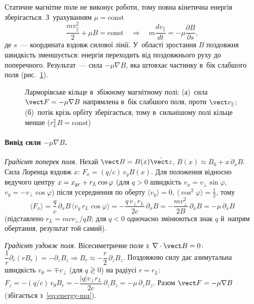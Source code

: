 Статичне магнітне поле не виконує роботи, тому повна кінетична енергія зберігається. З~урахуванням
$\mu=\mathrm{const}$
\begin{equation}\label{eq:energy-mu}
	\frac{mv_\parallel^2}2+\mu B=\mathrm{const}\quad\Rightarrow\quad m\frac{dv_\parallel}{dt}=-\mu\frac{\partial B}{\partial s},
\end{equation}
де $s$~--- координата вздовж силової лінії. У~області зростання $B$ поздовжня швидкість
зменшується: енергія переходить від поздовжнього руху до поперечного. Результат~--- сила
$-\mu\nabla B$, яка штовхає частинку в~бік слабшого поля (рис.~\ref{fig:gradb-force}).

\begin{figure}[ht]\centering
	\begin{subfigure}[t]{0.5\linewidth}\centering
		\caption{}
	\end{subfigure}%
	\begin{subfigure}[t]{0.5\linewidth}\centering
		\caption{}
	\end{subfigure}
	\caption{Ларморівське кільце в~збіжному магнітному полі: (а)~сила $\vect F=-\mu\nabla B$
	напрямлена в~бік слабшого поля, проти $\vect v_\parallel$; (б)~потік крізь орбіту зберігається,
	тому в~сильнішому полі кільце менше ($r_L^2B=\mathrm{const}$)}
	\label{fig:gradb-force}
\end{figure}

\paragraph{Вивід сили $-\mu\nabla B$.}
\emph{Градієнт поперек поля.} Нехай $\vect B=B(x)\hat{\vect z}$, $B(x)\approx B_0+x\,\partial_xB$.
Сила Лоренца вздовж $x$: $F_x=(q/c)\,v_yB(x)$. Для положення відносно ведучого центру
$x=x_{\rm gc}+r_L\cos\varphi$ (для $q>0$ швидкість $v_x=v_\perp\sin\varphi$, $v_y=-v_\perp\cos\varphi$) після усереднення по
оберту $\langle v_y\rangle=0$, $\langle\cos^2\varphi\rangle=\tfrac12$, тому
\[\langle F_x\rangle=\frac qc\,\partial_xB\,\langle v_y\,r_L\cos\varphi\rangle
=-\frac{q\,v_\perp r_L}{2c}\,\partial_xB=-\frac{mv_\perp^2}{2B}\,\partial_xB=-\mu\,\partial_xB\]
(підставлено $r_L=mcv_\perp/qB$; для $q<0$ одночасно змінюються знак $q$ й~напрям обертання, результат той самий).

\emph{Градієнт уздовж поля.} Вісесиметричне поле з~$\nabla\cdot\vect B=0$:
$\dfrac1r\partial_r(rB_r)=-\partial_zB_z\Rightarrow B_r\approx-\dfrac r2\,\partial_zB_z$.
Поздовжню силу дає азимутальна швидкість $v_\theta=\mp v_\perp$ (для $q\gtrless0$) на радіусі $r=r_L$:
$F_z=-(q/c)\,v_\theta B_r=-\dfrac{|q|v_\perp r_L}{2c}\,\partial_zB_z=-\mu\,\partial_zB_z$.
Разом $\vect F=-\mu\nabla B$ (збігається з~\eqref{eq:energy-mu}).

